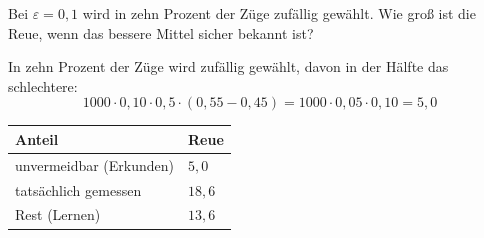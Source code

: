 \begin{aufgabe}
Bei $\varepsilon = 0{,}1$ wird in zehn Prozent der Züge zufällig gewählt. Wie groß ist die Reue, wenn das bessere Mittel sicher bekannt ist?

\loesung
{}
In zehn Prozent der Züge wird zufällig gewählt, davon in der Hälfte das schlechtere:
\[ 1000\cdot0{,}10\cdot0{,}5\cdot(0{,}55-0{,}45) = 1000\cdot0{,}05\cdot0{,}10 = 5{,}0 \]

\begin{center}
{\small
\renewcommand{\arraystretch}{1.48}
\begin{tabular}{@{}P{3.2cm}P{2.4cm}@{}}
\toprule
\textbf{Anteil} & \textbf{Reue}\\
\midrule
unvermeidbar (Erkunden) & $5{,}0$\\
tatsächlich gemessen & $18{,}6$\\
\midrule
Rest (Lernen) & $13{,}6$\\
\bottomrule
\end{tabular}}
\end{center}

\begin{center}
\begin{minipage}{0.88\textwidth}
\end{minipage}
\end{center}
\end{aufgabe}

